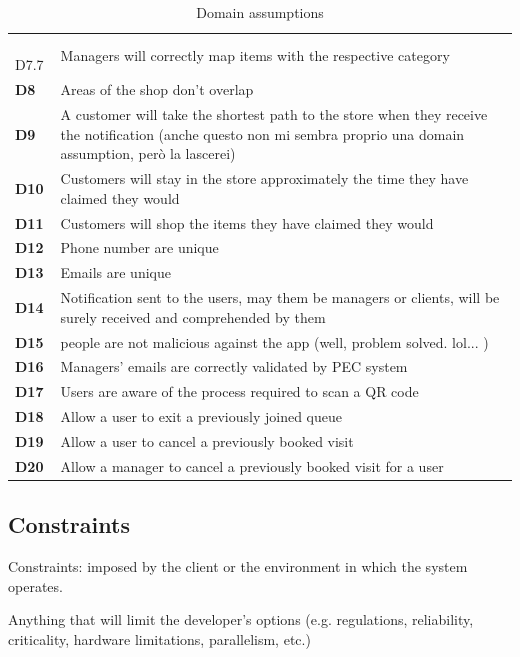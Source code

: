 \begin{table}[h!]
\begin{tabular}{@{}P{0.1\textwidth}P{0.80\textwidth}@{}}
        $\;\;$D7.7         & Managers will correctly map items with the respective category\\
        \textbf{D8}       & Areas of the shop don’t overlap\\
        \textbf{D9}       & A customer will take the shortest path to the store when they receive the notification (anche questo non mi sembra proprio una domain assumption, però la lascerei)\\
        \textbf{D10}       & Customers will stay in the store approximately the time they have claimed they would\\
        \textbf{D11}       & Customers will shop the items they have claimed they would\\
        \textbf{D12}       & Phone number are unique\\
        \textbf{D13}       & Emails are unique\\
        \textbf{D14}       & Notification sent to the users, may them be managers or clients, will be surely received and comprehended by them\\
        \textbf{D15}       &  people are not malicious against the app (well, problem solved. lol... )\\
        \textbf{D16}       & Managers' emails are correctly validated by PEC system\\
        \textbf{D17}       & Users are aware of the process required to scan a QR code\\
        \textbf{D18}       & Allow a user to exit a previously joined queue\\
        \textbf{D19}       & Allow a user to cancel a previously booked visit\\
        \textbf{D20}       & Allow a manager to cancel a previously booked visit for a user\\

        \bottomrule
    \end{tabular}
\caption{Domain assumptions}
\label{table:domainassumptions}
\end{table}

\subsection{Constraints}
\label{subsect:contraints}

Constraints: imposed by the client or the environment in which the system operates. 

Anything that will limit the developer’s options (e.g. regulations, reliability, criticality, hardware limitations, parallelism, etc.)

